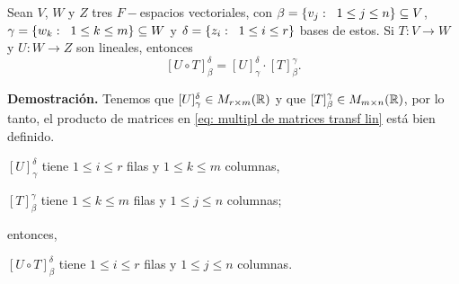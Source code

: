 \begin{prop}
	\label{prop: calculo de composicion de transf a partir de producto de matr}
Sean $V$, $W$ y $Z$ tres $F-$espacios vectoriales,
con
$\beta = \{ v_{j} : \hspace{0.2cm} 1 \leq j \leq n \} \subseteq V$,
$\gamma = \{ w_{k}: \hspace{0.2cm} 1 \leq k \leq m \} \subseteq W$
y $\delta = \{ z_{i}: \hspace{0.2cm} 1 \leq i \leq r \}$
bases de estos. Si
$T: V \longrightarrow W$ y $U: W \longrightarrow Z$ son lineales,
entonces
 \begin{equation}
	\label{eq: multipl de matrices transf lin}
	[U \circ T]_{\beta}^{\delta} = [U]_{\gamma}^{\delta} \cdot  
[T]_{\beta}^{\gamma}.
\end{equation}
\end{prop}
\noindent
\textbf{Demostración.}
Tenemos que $[U]_{\gamma}^{\delta} \in M_{r \times m}(\mathbb{R})$
y que $[T]_{\beta}^{\gamma} \in M_{m \times n}(\mathbb{R})$, por lo tanto, 
el producto de matrices en 
\eqref{eq: multipl de matrices transf lin} está bien definido.
\begin{center}
$[U]_{\gamma}^{\delta}$ tiene $1 \leq i \leq r$ filas y 
$1 \leq k \leq m$ columnas,
\end{center}
\begin{center}
$[T]_{\beta}^{\gamma}$ tiene $1 \leq k \leq m$ filas y 
$1 \leq j \leq n$ columnas;
\end{center}
entonces,
\begin{center}
$[U \circ T]_{\beta}^{\delta}$ tiene $1 \leq i \leq r$ filas y 
$1 \leq j \leq n$ columnas.
\end{center}

